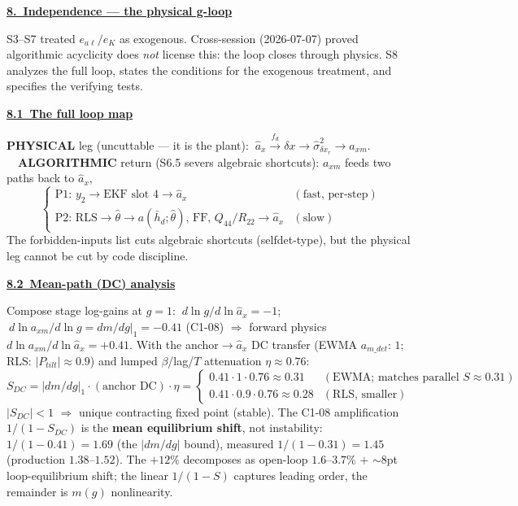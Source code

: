 \documentclass[11pt,a4paper,fontset=none]{ctexart}
\newcommand{\hd}[1]{\par\medskip\noindent\underline{\textbf{#1}}\par\nobreak\vspace{0.2ex}}
\newcommand{\ealev}{e_{a\ell}}
\begin{document}
\newpage
\hd{8.\ Independence --- the physical g-loop}
S3--S7 treated $\ealev/e_K$ as exogenous. Cross-session (2026-07-07) proved algorithmic acyclicity does \emph{not} license this: the loop closes through physics. S8 analyzes the full loop, states the conditions for the exogenous treatment, and specifies the verifying tests.

\hd{8.1\ The full loop map}
\textbf{PHYSICAL} leg (uncuttable --- it is the plant): $\ \hat a_x \xrightarrow{\,f_d\,} \delta x \to \hat\sigma^2_{\delta x_r} \to a_{xm}$.
\ \ \textbf{ALGORITHMIC} return (S6.5 severs algebraic shortcuts): $a_{xm}$ feeds two paths back to $\hat a_x$,
\[
\begin{cases}
\text{P1: } y_2 \to \text{EKF slot 4} \to \hat a_x & (\text{fast, per-step}) \\
\text{P2: RLS} \to \hat\theta \to a(\bar h_d;\hat\theta),\,\text{FF},\,Q_{44}/R_{22} \to \hat a_x & (\text{slow})
\end{cases}
\]
The forbidden-inputs list cuts algebraic shortcuts (selfdet-type), but the physical leg cannot be cut by code discipline.

\hd{8.2\ Mean-path (DC) analysis}
Compose stage log-gains at $g{=}1$: $\ d\ln g/d\ln\hat a_x=-1$; $\ d\ln a_{xm}/d\ln g = dm/dg|_1=-0.41$ (C1-08) $\Rightarrow$ forward physics $d\ln a_{xm}/d\ln\hat a_x=+0.41$. With the anchor$\to\hat a_x$ DC transfer (EWMA $a_{m\_det}$: $1$; RLS: $|P_{tilt}|\!\approx\!0.9$) and lumped $\beta$/lag/$T$ attenuation $\eta\!\approx\!0.76$:
\[ S_{DC} = |dm/dg|_1\cdot(\text{anchor DC})\cdot\eta =
\begin{cases} 0.41\cdot 1\cdot 0.76 \approx 0.31 & (\text{EWMA; matches parallel } S\!\approx\!0.31) \\ 0.41\cdot 0.9\cdot 0.76 \approx 0.28 & (\text{RLS, smaller}) \end{cases} \]
$|S_{DC}|<1$ $\Rightarrow$ unique contracting fixed point (stable). The C1-08 amplification $1/(1-S_{DC})$ is the \textbf{mean equilibrium shift}, not instability: $1/(1{-}0.41){=}1.69$ (the $|dm/dg|$ bound), measured $1/(1{-}0.31){=}1.45$ (production $1.38$--$1.52$). The $+12\%$ decomposes as open-loop $1.6$--$3.7\%$ $+$ $\sim\!8$pt loop-equilibrium shift; the linear $1/(1{-}S)$ captures leading order, the remainder is $m(g)$ nonlinearity.
\end{document}
